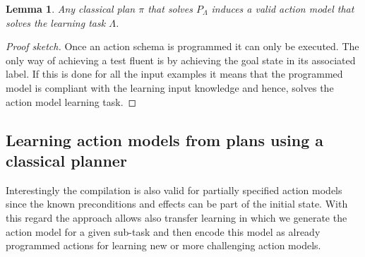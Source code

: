 \documentclass[letterpaper]{article} %
\newtheorem{lemma}[theorem]{Lemma}
\begin{document}
\begin{lemma}
Any classical plan $\pi$ that solves $P_{\Lambda}$ induces a valid action model that solves the learning task $\Lambda$.
\end{lemma}

\begin{proof}[Proof sketch]
Once an action schema is programmed it can only be executed. The only way of achieving a test fluent is by achieving the goal state in its associated label. If this is done for all the input examples it means that the programmed model is compliant with the learning input knowledge and hence, solves the action model learning task.
\end{proof}

\subsection{Learning action models from plans using a classical planner}
Interestingly the compilation is also valid for partially specified action models since the known preconditions and effects can be part of the initial state. With this regard the approach allows also transfer learning in which we generate the action model for a given sub-task and then encode this model as already programmed actions for learning new or more challenging action models.
\end{document}
